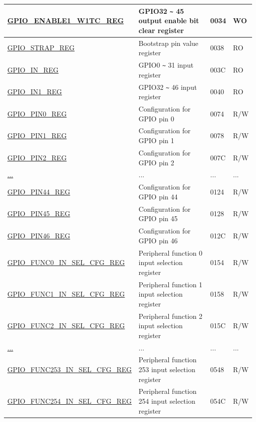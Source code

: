 \begin{longtable}{ | p{6cm} | p{7.2cm} | p{1.3cm} | p{1cm} | }
\hyperref[regdesc:GPIOENABLE1W1TCREG]{GPIO\_ENABLE1\_W1TC\_REG} & GPIO32 \verb+~+ 45 output enable bit clear register & \hexprefix{}0034 & WO \\ \hline
\hyperref[regdesc:GPIOSTRAPREG]{GPIO\_STRAP\_REG} & Bootstrap pin value register & \hexprefix{}0038 & RO \\ \hline
\hyperref[regdesc:GPIOINREG]{GPIO\_IN\_REG} & GPIO0 \verb+~+ 31 input register & \hexprefix{}003C & RO \\ \hline
\hyperref[regdesc:GPIOIN1REG]{GPIO\_IN1\_REG} & GPIO32 \verb+~+ 46 input register & \hexprefix{}0040 & RO \\ \hline
\hyperref[regdesc:GPIOPINNREG]{GPIO\_PIN0\_REG} & Configuration for GPIO pin 0 & \hexprefix{}0074 & R/W \\ \hline
\hyperref[regdesc:GPIOPINNREG]{GPIO\_PIN1\_REG} & Configuration for GPIO pin 1 & \hexprefix{}0078 & R/W \\ \hline
\hyperref[regdesc:GPIOPINNREG]{GPIO\_PIN2\_REG} & Configuration for GPIO pin 2 & \hexprefix{}007C & R/W \\ \hline
\hyperref[regdesc:GPIOPINNREG]{...} & ... & ... & ... \\ \hline
\hyperref[regdesc:GPIOPINNREG]{GPIO\_PIN44\_REG} & Configuration for GPIO pin 44 & \hexprefix{}0124 & R/W \\ \hline
\hyperref[regdesc:GPIOPINNREG]{GPIO\_PIN45\_REG} & Configuration for GPIO pin 45 & \hexprefix{}0128 & R/W \\ \hline
\hyperref[regdesc:GPIOPINNREG]{GPIO\_PIN46\_REG} & Configuration for GPIO pin 46 & \hexprefix{}012C & R/W \\ \hline
\hyperref[regdesc:GPIOFUNCNINSELCFGREG]{GPIO\_FUNC0\_IN\_SEL\_CFG\_REG} & Peripheral function 0 input selection register & \hexprefix{}0154 & R/W \\ \hline
\hyperref[regdesc:GPIOFUNCNINSELCFGREG]{GPIO\_FUNC1\_IN\_SEL\_CFG\_REG} & Peripheral function 1 input selection register & \hexprefix{}0158 & R/W \\ \hline
\hyperref[regdesc:GPIOFUNCNINSELCFGREG]{GPIO\_FUNC2\_IN\_SEL\_CFG\_REG} & Peripheral function 2 input selection register & \hexprefix{}015C & R/W \\ \hline
\hyperref[regdesc:GPIOFUNCNINSELCFGREG]{...} & ... & ... & ... \\ \hline
\hyperref[regdesc:GPIOFUNCNINSELCFGREG]{GPIO\_FUNC253\_IN\_SEL\_CFG\_REG} & Peripheral function 253 input selection register & \hexprefix{}0548 & R/W \\ \hline
\hyperref[regdesc:GPIOFUNCNINSELCFGREG]{GPIO\_FUNC254\_IN\_SEL\_CFG\_REG} & Peripheral function 254 input selection register & \hexprefix{}054C & R/W \\ \hline

\end{longtable}
